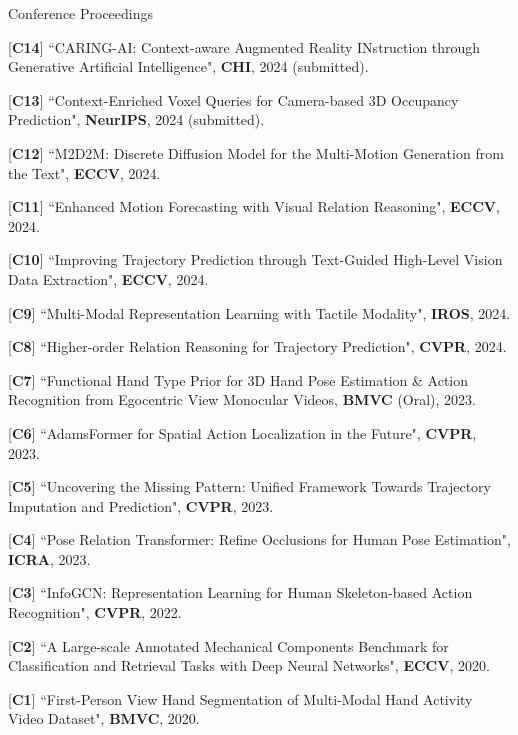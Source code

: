 


\begin{cventries}
\cvpub
{Conference Proceedings} %
{ %
\begin{cvitems}
    \item {[\textbf{C14}] ``CARING-AI: Context-aware Augmented Reality INstruction through Generative Artificial Intelligence", \textbf{CHI}, 2024 (submitted).}
    \item {[\textbf{C13}] ``Context-Enriched Voxel Queries for Camera-based 3D Occupancy Prediction", \textbf{NeurIPS}, 2024 (submitted).}
    \item {[\textbf{C12}] ``M2D2M: Discrete Diffusion Model for the Multi-Motion Generation from the Text", \textbf{ECCV}, 2024.}
    \item {[\textbf{C11}] ``Enhanced Motion Forecasting with Visual Relation Reasoning", \textbf{ECCV}, 2024.}
    \item {[\textbf{C10}] ``Improving Trajectory Prediction through Text-Guided High-Level Vision Data Extraction", \textbf{ECCV}, 2024.}
    \item {[\textbf{C9}] ``Multi-Modal Representation Learning with Tactile Modality", \textbf{IROS}, 2024.}
    \item {[\textbf{C8}] ``Higher-order Relation Reasoning for Trajectory Prediction", \textbf{CVPR}, 2024.}
    \item {[\textbf{C7}] ``Functional Hand Type Prior for 3D Hand Pose Estimation \& Action Recognition from Egocentric View Monocular Videos, \textbf{BMVC} (Oral), 2023.}
    \item {[\textbf{C6}] ``AdamsFormer for Spatial Action Localization in the Future", \textbf{CVPR}, 2023.}
    \item {[\textbf{C5}] ``Uncovering the Missing Pattern: Unified Framework Towards Trajectory Imputation and Prediction", \textbf{CVPR}, 2023.}
    \item {[\textbf{C4}] ``Pose Relation Transformer: Refine Occlusions for Human Pose Estimation", \textbf{ICRA}, 2023.}
    \item {[\textbf{C3}] ``InfoGCN: Representation Learning for Human Skeleton-based Action Recognition", \textbf{CVPR}, 2022.}
    \item {[\textbf{C2}] ``A Large-scale Annotated Mechanical Components Benchmark for Classification and Retrieval Tasks with Deep Neural Networks", \textbf{ECCV}, 2020.}
    \item {[\textbf{C1}] ``First-Person View Hand Segmentation of Multi-Modal Hand Activity Video Dataset", \textbf{BMVC}, 2020.}
\end{cvitems}
}



\end{cventries}
